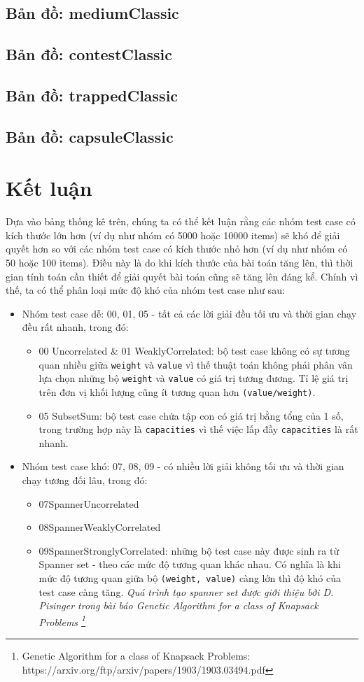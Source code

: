 \documentclass[12pt, a4paper]{article}
\begin{document}
\subsection{Bản đồ: mediumClassic}
\subsection{Bản đồ: contestClassic}
\subsection{Bản đồ: trappedClassic}
\subsection{Bản đồ: capsuleClassic}
\section{Kết luận}
Dựa vào bảng thống kê trên, chúng ta có thể kết luận rằng các nhóm test case có kích thước lớn hơn (ví dụ như nhóm có 5000 hoặc 10000 items) sẽ khó để giải quyết hơn so với các nhóm test case có kích thước nhỏ hơn (ví dụ như nhóm có 50 hoặc 100 items). Điều này là do khi kích thước của bài toán tăng lên, thì thời gian tính toán cần thiết để giải quyết bài toán cũng sẽ tăng lên đáng kể. Chính vì thế, ta có thể phân loại mức độ khó của nhóm test case như sau:\begin{itemize}
    \item Nhóm test case dễ: 00, 01, 05 - tất cả các lời giải đều tối ưu và thời gian chạy đều rất nhanh, trong đó:
    \begin{itemize}
        \item 00 Uncorrelated \& 01 WeaklyCorrelated: bộ test case không có sự tương quan nhiều giữa \texttt{weight} và \texttt{value} vì thế thuật toán không phải phân vân lựa chọn những bộ \texttt{weight} và \texttt{value} có giá trị tương đương. Tỉ lệ giá trị trên đơn vị khối lượng cũng ít tương quan hơn \texttt{(value/weight)}.
        \item 05 SubsetSum: bộ test case chứa tập con có giá trị bằng tổng của 1 số, trong trường hợp này là \texttt{capacities} vì thế việc lấp đầy \texttt{capacities} là rất nhanh.
    \end{itemize}
    \item Nhóm test case khó: 07, 08, 09 - có nhiều lời giải không tối ưu và thời gian chạy tương đối lâu, trong đó:
    \begin{itemize}
        \item 07SpannerUncorrelated
        \item 08SpannerWeaklyCorrelated
        \item 09SpannerStronglyCorrelated: những bộ test case này được sinh ra từ Spanner set - theo các mức độ tương quan khác nhau. Có nghĩa là khi mức độ tương quan giữa bộ \texttt{(weight, value)} càng lớn thì độ khó của test case càng tăng. \textit{Quá trình tạo spanner set được giới thiệu bởi D. Pisinger trong bài báo Genetic Algorithm for a class of Knapsack Problems \footnote{Genetic Algorithm for a class of Knapsack Problems: https://arxiv.org/ftp/arxiv/papers/1903/1903.03494.pdf}}
    \end{itemize}
\end{itemize}
\end{document}
